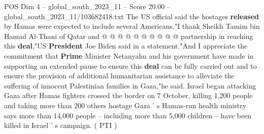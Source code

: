 \begin{textsample}{POS Dim 4 – global\_south\_2023\_11 – Score 20.00 – global\_south\_2023\_11/103682418.txt}
The US official said the hostages \textbf{released} by Hamas were expected to include several Americans."I thank Sheikh Tamim bin Hamad Al-Thani of Qatar and @ @ @ @ @ @ @ @ @ @ partnership in reaching this \textbf{deal},"US \textbf{President} Joe Biden said in a statement."And I appreciate the commitment that \textbf{Prime} Minister Netanyahu and his government have made in supporting an extended pause to ensure this \textbf{deal} can be fully carried out and to ensure the provision of additional humanitarian assistance to alleviate the suffering of innocent Palestinian families in Gaza,"he said.
Israel began attacking Gaza after Hamas fighters crossed the border on 7 October, killing 1,200 people and taking more than 200 others hostage Gaza ' s Hamas-run health ministry says more than 14,000 people -- including more than 5,000 children -- have been killed in Israel ' s campaign. ( PTI )

\end{textsample}
